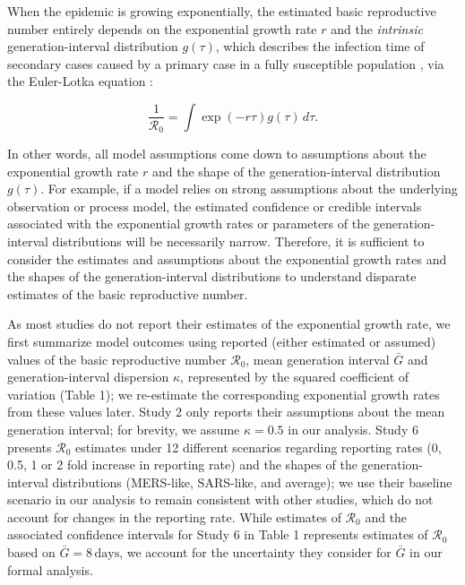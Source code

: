 \documentclass[12pt]{article}
\newcommand{\Ro}{\ensuremath{{\mathcal R}_{0}}\xspace}
\begin{document}
When the epidemic is growing exponentially, the estimated basic reproductive number entirely depends on the exponential growth rate $r$ and the \emph{intrinsic} generation-interval distribution $g(\tau)$, which describes the infection time of secondary cases caused by a primary case in a fully susceptible population \citep{champredon2015intrinsic}, via the Euler-Lotka equation \citep{wallinga2007generation}:
\begin{linenomath*}
\begin{equation}
\frac{1}{\Ro} = \int \exp(-r\tau) g(\tau) \, d\tau.
\label{eq:euler}
\end{equation}
\end{linenomath*}
In other words, all model assumptions come down to assumptions about the exponential growth rate $r$ and the shape of the generation-interval distribution $g(\tau)$.
For example, if a model relies on strong assumptions about the underlying observation or process model, the estimated confidence or credible intervals associated with the exponential growth rates or parameters of the generation-interval distributions will be necessarily narrow.
Therefore, it is sufficient to consider the estimates and assumptions about the exponential growth rates and the shapes of the generation-interval distributions to understand disparate estimates of the basic reproductive number.

As most studies do not report their estimates of the exponential growth rate, we first summarize model outcomes using reported (either estimated or assumed) values of the basic reproductive number \Ro, mean generation interval $\bar G$ and generation-interval dispersion $\kappa$, represented by the squared coefficient of variation (Table 1);
we re-estimate the corresponding exponential growth rates from these values later.
Study 2 only reports their assumptions about the mean generation interval; for brevity, we assume $\kappa = 0.5$ in our analysis.
Study 6 presents \Ro estimates under 12 different scenarios regarding reporting rates (0, 0.5, 1 or 2 fold increase in reporting rate) and the shapes of the generation-interval distributions (MERS-like, SARS-like, and average);
we use their baseline scenario in our analysis to remain consistent with other studies, which do not account for changes in the reporting rate.
While estimates of \Ro and the associated confidence intervals for Study 6 in Table 1 represents estimates of \Ro based on $\bar G = 8\,\mathrm{days}$, we account for the uncertainty they consider for $\bar G$ in our formal analysis.
\end{document}

